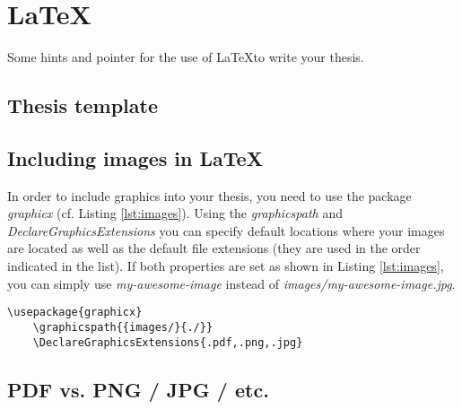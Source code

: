 \documentclass{article}
\begin{document}
\appendix







\section{\LaTeX}


Some hints and pointer for the use of \LaTeX to write your thesis.

\subsection{Thesis template}




\subsection{Including images in \LaTeX}

In order to include graphics into your thesis, you need to use the package \emph{graphicx} (cf. Listing \ref{lst:images}).
Using the \emph{graphicspath} and \emph{DeclareGraphicsExtensions} you can specify default locations where your images are located as well as the default file extensions (they are used in the order indicated in the list).
If both properties are set as shown in Listing \ref{lst:images}, you can simply use \emph{my-awesome-image} instead of \emph{images/my-awesome-image.jpg}.

\begin{lstlisting}[label={lst:images},caption='Packages and settings for including images']
	\usepackage{graphicx}
	\graphicspath{{images/}{./}}
	\DeclareGraphicsExtensions{.pdf,.png,.jpg}
\end{lstlisting}


\subsection{PDF vs. PNG / JPG / etc.}
\end{document}
